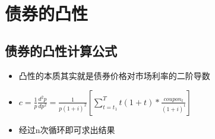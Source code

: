 \documentclass[11pt]{article}
\providecommand{\tightlist}{%
      \setlength{\itemsep}{0pt}\setlength{\parskip}{0pt}}
\begin{document}
    \begin{center}
    \end{center}
    { \hspace*{\fill} \\}
    
    \section{债券的凸性}\label{ux503aux5238ux7684ux51f8ux6027}

    \subsection{债券的凸性计算公式}\label{ux503aux5238ux7684ux51f8ux6027ux8ba1ux7b97ux516cux5f0f}

\begin{itemize}
\tightlist
\item
  凸性的本质其实就是债券价格对市场利率的二阶导数
\item
  \(c = \frac{1}{p}\frac{d^2p}{dp^2}=\frac{1}{p(1+i)^2}[\sum_{t = t_1}^Tt(1+t)*\frac{coupon_t}{(1+i)^t}]\)
\item
  经过n次循环即可求出结果
\end{itemize}
\end{document}

